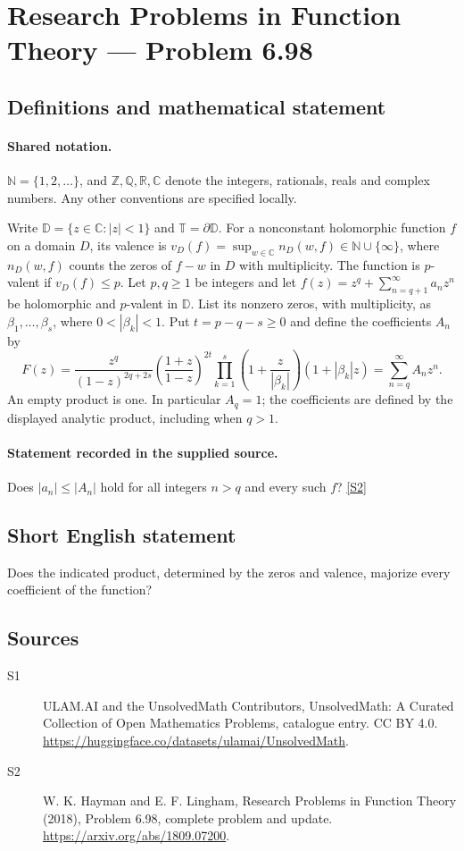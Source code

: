 \documentclass[11pt]{article}
\newcommand{\sref}[2]{\hyperlink{source:#1:#2}{[S#2]}}
\begin{document}
\section{Research Problems in Function Theory — Problem 6.98}\label{statement}

\subsection{Definitions and mathematical statement}

\paragraph{Shared notation.}$\mathbb N=\{1,2,\ldots\}$, and $\mathbb Z,\mathbb Q,\mathbb R,\mathbb C$ denote the integers, rationals, reals and complex numbers. Any other conventions are specified locally.


Write $\mathbb D=\{z\in\mathbb C:|z|<1\}$ and $\mathbb T=\partial\mathbb D$. For a nonconstant holomorphic function $f$ on a domain $D$, its valence is $v_D(f)=\sup_{w\in\mathbb C}n_D(w,f)\in\mathbb N\cup\{\infty\}$, where $n_D(w,f)$ counts the zeros of $f-w$ in $D$ with multiplicity. The function is $p$-valent if $v_D(f)\leq p$. Let $p,q\geq1$ be integers and let $f(z)=z^q+\sum_{n=q+1}^{\infty}a_nz^n$ be holomorphic and $p$-valent in $\mathbb D$. List its nonzero zeros, with multiplicity, as $\beta_1,\ldots,\beta_s$, where $0<|\beta_k|<1$. Put $t=p-q-s\geq0$ and define the coefficients $A_n$ by
\[F(z)=\frac{z^q}{(1-z)^{2q+2s}}\left(\frac{1+z}{1-z}\right)^{2t}
\prod_{k=1}^{s}\left(1+\frac{z}{|\beta_k|}\right)(1+|\beta_k|z)
=\sum_{n=q}^{\infty}A_nz^n.\]
An empty product is one. In particular $A_q=1$; the coefficients are defined by the displayed analytic product, including when $q>1$.
\paragraph{Statement recorded in the supplied source.}
Does $|a_n|\leq|A_n|$ hold for all integers $n>q$ and every such $f$? \sref{statement}{2}
\subsection{Short English statement}
Does the indicated product, determined by the zeros and valence, majorize every coefficient of the function?
\subsection{Sources}
\begin{description}
\item[\hypertarget{source:statement:1}{S1}] ULAM.AI and the UnsolvedMath Contributors, UnsolvedMath: A Curated Collection of Open Mathematics Problems, catalogue entry. CC BY 4.0. \url{https://huggingface.co/datasets/ulamai/UnsolvedMath}.
\item[\hypertarget{source:statement:2}{S2}] W. K. Hayman and E. F. Lingham, Research Problems in Function Theory (2018), Problem 6.98, complete problem and update. \url{https://arxiv.org/abs/1809.07200}.
\end{description}
\label{end:statement}
\end{document}
